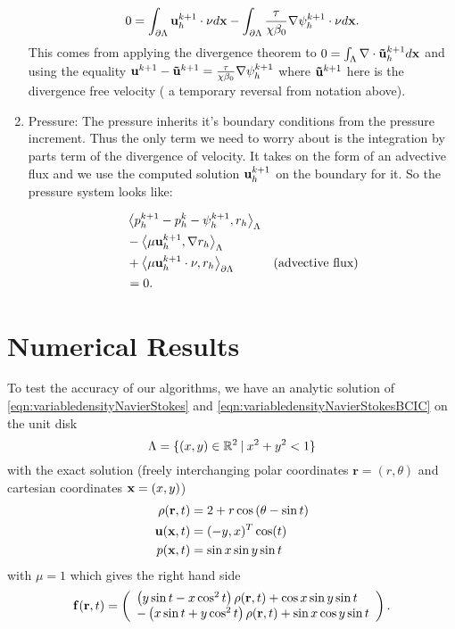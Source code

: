 \documentclass[letterpaper]{erdc}
\begin{document}
\begin{enumerate}
\begin{align}
  0 = \int_{\partial\Lambda} \textbf{u}^{k+1}_h \cdot \nu d\textbf{x} - \int_{\partial\Lambda} \frac{\tau}{\chi\beta_0}\nabla\psi^{k+1}_h\cdot\nu d\textbf{x}.
\end{align}
This comes from applying the divergence theorem to $0 = \int_{\Lambda} \nabla\cdot \mathbf{\tilde{u}}^{k+1}_h d\textbf{x}$ and using the equality $\textbf{u}^{k+1} - \mathbf{\tilde{u}}^{k+1} = \frac{\tau}{\chi\beta_0}\nabla\psi^{k+1}_h$ where $\mathbf{\tilde{u}}^{k+1}$ here is the divergence free velocity ( a temporary reversal from notation above).


\item  Pressure:  The pressure inherits it's boundary conditions from the pressure increment.  Thus the only term we need to worry about is the integration by parts term of the divergence of velocity.  It takes on the form of an advective flux and we use the computed solution $\textbf{u}^{k+1}_h$ on the boundary for it.  So the pressure system looks like:

\begin{align*}
 &\left\langle  p^{k+1}_h - p_h^{k} - \psi_h^{k+1},  r_h \right\rangle_{\Lambda} &\\
  &- \left\langle  \mu \textbf{u}^{k+1}_h,  \nabla r_h  \right\rangle_{\Lambda} &\\
  &+ \left\langle  \mu \textbf{u}^{k+1}_h\cdot\nu,  r_h  \right\rangle_{\partial\Lambda}        &\mbox{(advective flux)}\\
  & = 0.&
\end{align*}


\end{enumerate}


%
%
%
\section{Numerical Results}\label{sec:NumericalResults}

To test the accuracy of our algorithms, we have an analytic solution of \ref{eqn:variabledensityNavierStokes} and \ref{eqn:variabledensityNavierStokesBCIC} on the unit disk
\begin{equation}
  \Lambda = \{ (x,y) \in \mathbb{R}^{2} \:|\: x^2 + y^2 < 1 \}
\end{equation}
with the exact solution (freely interchanging polar coordinates $\mathbf{r} = (r,\theta)$ and cartesian coordinates $\textbf{x} = (x,y)$)
\begin{align}
  \rho(\mathbf{r},t) & = 2 + r\cos\left(\theta - \sin t  \right)\\
  \textbf{u}(\textbf{x},t) &= (-y, x)^T \cos(t)\\
  p(\textbf{x},t) &= \sin x \sin y \sin t
\end{align}
with $\mu = 1$ which gives the right hand side
\begin{equation}
  \mathbf{f}(\mathbf{r},t) = \left(\begin{array}{l} \left( y\sin t - x\cos^2 t\right)\rho(\mathbf{r},t) + \cos x \sin y \sin t\\ -\left(x \sin t + y\cos^2 t\right)\rho(\mathbf{r},t) + \sin x \cos y \sin t \end{array}\right).
\end{equation}
\end{document}
